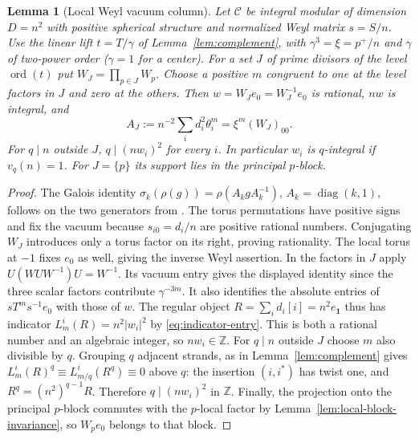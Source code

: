 \documentclass[11pt,a4paper]{article}
\numberwithin{equation}{section}
\newtheorem{lemma}[theorem]{Lemma}
\theoremstyle{remark}
\newcommand{\C}{\mathcal C}
\newcommand{\one}{\mathbf1}
\newcommand{\ZZ}{\mathbb Z}
\DeclareMathOperator{\ord}{ord}
\begin{document}
\begin{lemma}[Local Weyl vacuum column]\label{lem:local-vacuum-column}
Let $\C$ be integral modular of dimension $D=n^2$ with positive
spherical structure and normalized Weyl matrix $s=S/n$. Use the
linear lift $t=T/\gamma$ of Lemma~\ref{lem:complement}, with
$\gamma^3=\xi=p^+/n$ and $\gamma$ of two-power order
($\gamma=1$ for a center). For a set $J$ of prime divisors of the
level $\ord(t)$ put $W_J=\prod_{p\in J}W_p$. Choose a positive $m$
congruent to one at the level factors in $J$ and zero at the others.
Then $w=W_Je_0=W_J^{-1}e_0$ is rational, $nw$ is integral, and
\[
 A_J:=n^{-2}\sum_i d_i^2\theta_i^m=\xi^m (W_J)_{00}.
\]
For $q\mid n$ outside $J$, $q\mid(nw_i)^2$ for every $i$.
In particular $w_i$ is $q$-integral if $v_q(n)=1$.
For $J=\{p\}$ its support lies in the principal $p$-block.
\end{lemma}
\begin{proof}
The Galois identity
$\sigma_k(\rho(g))=\rho(A_k g A_k^{-1})$,
$A_k=\operatorname{diag}(k,1)$, follows on the two generators from
\cite[Theorem~II and Remark~4.5]{DLNCongruence}. The torus permutations
have positive signs and fix the vacuum because $s_{i0}=d_i/n$ are
positive rational numbers. Conjugating $W_J$ introduces only a torus
factor on its right, proving rationality. The local torus at $-1$
fixes $e_0$ as well, giving the inverse Weyl assertion.
In the factors in $J$ apply $U(WUW^{-1})U=W^{-1}$. Its vacuum
entry gives the displayed identity since the three scalar factors
contribute $\gamma^{-3m}$. It also identifies the absolute entries
of $sT^m s^{-1}e_0$ with those of $w$. The regular object
$R=\sum_i d_i[i]=n^2 e_{\one}$ thus has indicator
$L_m^i(R)=n^2|w_i|^2$ by \eqref{eq:indicator-entry}. This is both a
rational number and an algebraic integer, so $nw_i\in\ZZ$.
For $q\mid n$ outside $J$ choose $m$ also divisible by $q$. Grouping
$q$ adjacent strands, as in Lemma~\ref{lem:complement} gives
$L_m^i(R)^q\equiv L_{m/q}^i(R^q)\equiv0$ above $q$:
the insertion $(i,i^*)$ has twist one, and
$R^q=(n^2)^{q-1}R$. Therefore $q\mid(nw_i)^2$ in $\ZZ$.
Finally, the projection onto the principal $p$-block commutes with the
$p$-local factor by Lemma~\ref{lem:local-block-invariance}, so
$W_pe_0$ belongs to that block.
\end{proof}
\end{document}
